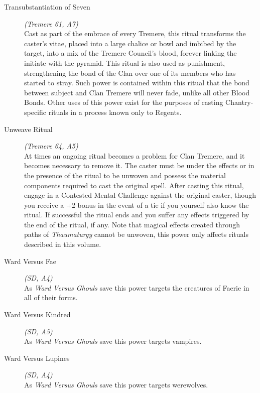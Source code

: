 \begin{description}
	\item[Transubstantiation of Seven] \emph{(Tremere 61, A7)} \hfill \\
	Cast as part of the embrace of every Tremere, this ritual transforms the caster's vitae, placed into a large chalice or bowl and 
	imbibed by the target, into a mix of the Tremere Council's blood, forever linking the initiate with the pyramid.  This ritual 
	is also used as punishment, strengthening the bond of the Clan over one of its members who has started to stray.  Such power is 
	contained within this ritual that the bond between subject and Clan Tremere will never fade, unlike all other Blood Bonds.  Other 
	uses of this power exist for the purposes of casting Chantry-specific rituals in a process known only to Regents. \\

	\item[Unweave Ritual] \emph{(Tremere 64, A5)} \hfill \\
	At times an ongoing ritual becomes a problem for Clan Tremere, and it becomes necessary to remove it.  The caster must be under 
	the effects or in the presence of the ritual to be unwoven and possess the material components required to cast the original 
	spell.  After casting this ritual, engage in a Contested Mental Challenge against the original caster, though you receive a 
	+2 bonus in the event of a tie if you yourself also know the ritual.  If successful the ritual ends and you suffer any effects 
	triggered by the end of the ritual, if any.  Note that magical effects created through paths of \emph{Thaumaturgy} cannot be unwoven, 
	this power only affects rituals described in this volume. \\

	\item[Ward Versus Fae] \emph{(SD, A4)} \hfill \\
	As \emph{Ward Versus Ghouls} save this power targets the creatures of Faerie in all of their forms. \\

	\item[Ward Versus Kindred] \emph{(SD, A5)} \hfill \\
	As \emph{Ward Versus Ghouls} save this power targets vampires. \\

	\item[Ward Versus Lupines] \emph{(SD, A4)} \hfill \\
	As \emph{Ward Versus Ghouls} save this power targets werewolves. \\


\end{description}

